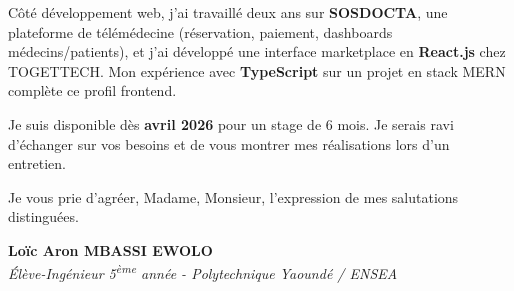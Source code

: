 \documentclass[a4paper,11pt]{article}
\begin{document}
Côté développement web, j'ai travaillé deux ans sur \textbf{SOSDOCTA}, une plateforme de télémédecine (réservation, paiement, dashboards médecins/patients), et j'ai développé une interface marketplace en \textbf{React.js} chez TOGETTECH. Mon expérience avec \textbf{TypeScript} sur un projet en stack MERN complète ce profil frontend.

Je suis disponible dès \textbf{avril 2026} pour un stage de 6 mois. Je serais ravi d'échanger sur vos besoins et de vous montrer mes réalisations lors d'un entretien.

Je vous prie d'agréer, Madame, Monsieur, l'expression de mes salutations distinguées.

\vspace{1cm}

\textbf{Loïc Aron MBASSI EWOLO}\\
\textit{Élève-Ingénieur 5\textsuperscript{ème} année - Polytechnique Yaoundé / ENSEA}
\end{document}
